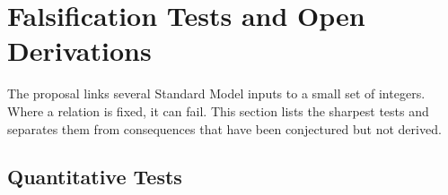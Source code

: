 \section{Falsification Tests and Open Derivations}

The proposal links several Standard Model inputs to a small set of integers. Where a relation is fixed, it can fail. This section lists the sharpest tests and separates them from consequences that have been conjectured but not derived.

\subsection{Quantitative Tests}


